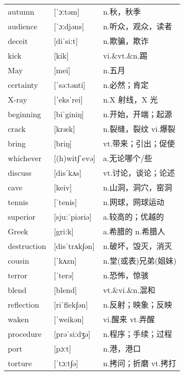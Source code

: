 \documentclass[a4paper]{article}
\begin{document}
\section{}
\begin{tabular}{l l l}

autumn & [ˈɔːtəm] & n.秋，秋季 \\
audience & [ˈɔːdjəns] & n.听众，观众，读者 \\
deceit & [diˈsiːt] & n.欺骗，欺诈 \\
kick & [kik] & vi.\&vt.\&n.踢 \\
May & [mei] & n.五月 \\
certainty & [ˈsəːtənti] & n.必然；肯定 \\
X-ray & [ˈeksˈrei] & n.X 射线，X 光 \\
beginning & [biˈginiŋ] & n.开始，开端；起源 \\
crack & [kræk] & n.裂缝，裂纹 vi.爆裂 \\
bring & [briŋ] & vt.带来；引出；促使 \\
whichever & [(h)wit∫ˈevə] & a.无论哪个/些 \\
discuss & [disˈkʌs] & vt.讨论，谈论；论述 \\
cave & [keiv] & n.山洞，洞穴，窑洞 \\
tennis & [ˈtenis] & n.网球，网球运动 \\
superior & [sjuːˈpiəriə] & a.较高的；优越的 \\
Greek & [griːk] & a.希腊的 n.希腊人 \\
destruction & [disˈtrʌk∫ən] & n.破坏，毁灭，消灭 \\
cousin & [ˈkʌzn] & n.堂(或表)兄弟(姐妹) \\
terror & [ˈterə] & n.恐怖，惊骇 \\
blend & [blend] & vt.\&vi.\&n.混和 \\
reflection & [riˈflek∫ən] & n.反射；映象；反映 \\
waken & [ˈweikən] & vi.醒来 vt.弄醒 \\
procedure & [prəˈsiːdʒə] & n.程序；手续；过程 \\
port & [pɔːt] & n.港，港口 \\
torture & [ˈtɔːt∫ə] & n.拷问；折磨 vt.拷打 \\

\end{tabular}
\end{document}
